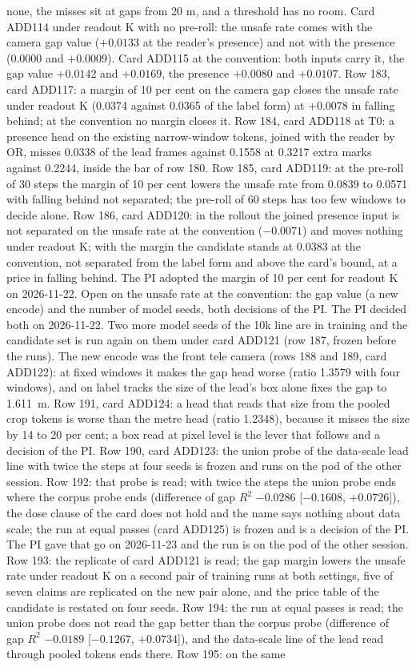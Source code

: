 \documentclass[10pt,twocolumn]{article}
\theoremstyle{remark}
\newcommand{\tier}[1]{\textsc{\small #1}}
\begin{document}
none, the misses sit at gaps from 20 m, and a threshold has no room. Card ADD114 under readout K with no pre-roll: the unsafe rate comes with the camera gap value ($+0.0133$ at the reader's presence) and not with the presence (0.0000 and $+0.0009$). Card ADD115 at the convention: both inputs carry it, the gap value $+0.0142$ and $+0.0169$, the presence $+0.0080$ and $+0.0107$. Row 183, card ADD117: a margin of 10 per cent on the camera gap closes the unsafe rate under readout K (0.0374 against 0.0365 of the label form) at $+0.0078$ in falling behind; at the convention no margin closes it. Row 184, card ADD118 at \tier{T0}: a presence head on the existing narrow-window tokens, joined with the reader by OR, misses 0.0338 of the lead frames against 0.1558 at 0.3217 extra marks against 0.2244, inside the bar of row 180. Row 185, card ADD119: at the pre-roll of 30 steps the margin of 10 per cent lowers the unsafe rate from 0.0839 to 0.0571 with falling behind not separated; the pre-roll of 60 steps has too few windows to decide alone. Row 186, card ADD120: in the rollout the joined presence input is not separated on the unsafe rate at the convention ($-0.0071$) and moves nothing under readout K; with the margin the candidate stands at 0.0383 at the convention, not separated from the label form and above the card's bound, at a price in falling behind. The PI adopted the margin of 10 per cent for readout K on 2026-11-22. Open on the unsafe rate at the convention: the gap value (a new encode) and the number of model seeds, both decisions of the PI. The PI decided both on 2026-11-22. Two more model seeds of the 10k line are in training and the candidate set is run again on them under card ADD121 (row 187, frozen before the runs). The new encode was the front tele camera (rows 188 and 189, card ADD122): at fixed windows it makes the gap head worse (ratio 1.3579 with four windows), and on label tracks the size of the lead's box alone fixes the gap to 1.611~m. Row 191, card ADD124: a head that reads that size from the pooled crop tokens is worse than the metre head (ratio 1.2348), because it misses the size by 14 to 20 per cent; a box read at pixel level is the lever that follows and a decision of the PI. Row 190, card ADD123: the union probe of the data-scale lead line with twice the steps at four seeds is frozen and runs on the pod of the other session. Row 192: that probe is read; with twice the steps the union probe ends where the corpus probe ends (difference of gap $R^2$ $-0.0286$ [$-0.1608$, $+0.0726$]), the dose clause of the card does not hold and the name says nothing about data scale; the run at equal passes (card ADD125) is frozen and is a decision of the PI. The PI gave that go on 2026-11-23 and the run is on the pod of the other session. Row 193: the replicate of card ADD121 is read; the gap margin lowers the unsafe rate under readout K on a second pair of training runs at both settings, five of seven claims are replicated on the new pair alone, and the price table of the candidate is restated on four seeds. Row 194: the run at equal passes is read; the union probe does not read the gap better than the corpus probe (difference of gap $R^2$ $-0.0189$ [$-0.1267$, $+0.0734$]), and the data-scale line of the lead read through pooled tokens ends there. Row 195: on the same 
\end{document}
